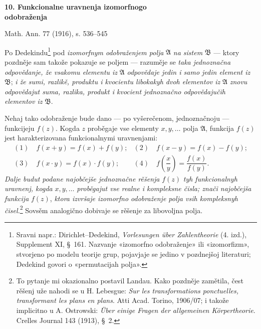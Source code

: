 \documentclass[11pt]{article}
\providecommand{\Afield}{\mathfrak A}
\providecommand{\Bfield}{\mathfrak B}
\begin{document}
\begin{center}
{\Large\bfseries 10. Funkcionalne uravnenja izomorfnogo\\ odobraženja}\par
\vspace{1.25em}
Math. Ann. 77 (1916), s. 536--545
\end{center}

\vspace{3em}

Po Dedekindu\footnote{Sravni napr.: Dirichlet--Dedekind, \emph{Vorlesungen über Zahlentheorie} (4. izd.), Supplement XI, \S\ 161. Nazvanje «izomorfno odobraženje» ili «izomorfizm», stvorjeno po modelu teorije grup, pojavjaje se jedino v pozdnejšoj literaturi; Dedekind govori o «permutacijah polja».} pod {\itshape izomorfnym odobraženjem polja} \(\Afield\) {\itshape na sistem} \(\Bfield\) --- ktory pozdněje sam takože pokazuje se poljem --- razuměje se {\itshape taka jednoznačna odpovědanje, že vsakomu elementu iz} \(\Afield\) {\itshape odpovědaje jedin i samo jedin element iz} \(\Bfield\); {\itshape i že sumi, razlikě, produktu i kvocientu libokakyh dvoh elementov iz} \(\Afield\) {\itshape znovu odpovědajut suma, razlika, produkt i kvocient jednoznačno odpovědajučih elementov iz} \(\Bfield\).

Nehaj tako odobraženje bude dano --- po vyšerečenom, jednoznačnoju --- funkcijeju \(f(z)\). Kogda \(z\) proběgaje vse elementy \(x,y,\ldots\) polja \(\Afield\), funkcija \(f(z)\) jest harakterizovana funkcionalnymi uravnenjami:
\[
\begin{array}{ll}
(1)\quad f(x+y)=f(x)+f(y); & (2)\quad f(x-y)=f(x)-f(y);\\[0.45em]
(3)\quad f(x\cdot y)=f(x)\cdot f(y); & (4)\quad f\!\left(\dfrac{x}{y}\right)=\dfrac{f(x)}{f(y)}.
\end{array}
\]
{\itshape Dalje budut podane najobčejše jednoznačne rěšenja} \(f(z)\) {\itshape tyh funkcionalnyh uravnenj, kogda} \(x,y,\ldots\) {\itshape proběgajut vse realne i kompleksne čisla; znači najobčejša funkcija} \(f(z)\), {\itshape ktora izvršaje izomorfno odobraženje polja vsih kompleksnyh čisel.}\footnote{To pytanje mi okazionalno postavil Landau. Kako pozdněje zamětila, čest rěšenj uže nahodi se u H. Lebesgue: \emph{Sur les transformations ponctuelles, transformant les plans en plans}. Atti Acad. Torino, 1906/07; i takože implicitno u A. Ostrowski: \emph{Über einige Fragen der allgemeinen Körpertheorie}. Crelles Journal 143 (1913), \S\ 2.} Sovsěm analogično dobivaje se rěšenje za libovoljna polja.
\end{document}
